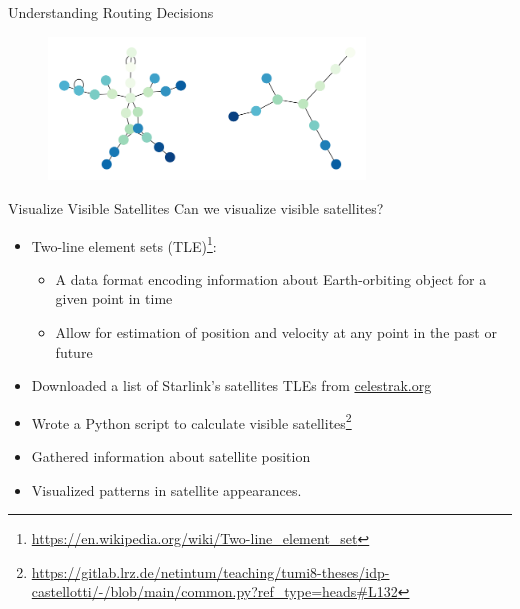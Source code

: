\documentclass[NET,english,beameralt]{tumbeamer}
\begin{document}
\begin{frame}{Understanding Routing Decisions}
    \begin{figure}
        \includegraphics[width=0.75\textwidth]{pics/aws_7_icmp.png}
    \end{figure}
\end{frame}

\begin{frame}{Visualize Visible Satellites}
    Can we visualize visible satellites?
    \begin{itemize}
        \item Two-line element sets (TLE)\footnote{\url{https://en.wikipedia.org/wiki/Two-line_element_set}}: 
        \begin{itemize} 
            \item A data format encoding information about Earth-orbiting object for a given point in time
            \item Allow for estimation of position and velocity at any point in the past or future
        \end{itemize}     
        \item Downloaded a list of Starlink's satellites TLEs from \href{celestrak.org}{celestrak.org}
        \item Wrote a Python script to calculate visible
        satellites\footnote{\url{https://gitlab.lrz.de/netintum/teaching/tumi8-theses/idp-castellotti/-/blob/main/common.py?ref_type=heads\#L132}}
        \item Gathered information about satellite position
        \item Visualized patterns in satellite appearances.
    \end{itemize}
\end{frame}
\end{document}

